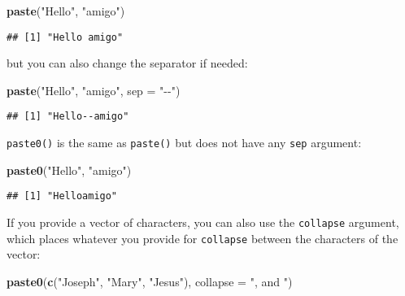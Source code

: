 \documentclass[
]{article}
\newenvironment{Shaded}{\begin{snugshade}}{\end{snugshade}}
\newcommand{\DataTypeTok}[1]{\textcolor[rgb]{0.13,0.29,0.53}{#1}}
\newcommand{\KeywordTok}[1]{\textcolor[rgb]{0.13,0.29,0.53}{\textbf{#1}}}
\newcommand{\NormalTok}[1]{#1}
\newcommand{\StringTok}[1]{\textcolor[rgb]{0.31,0.60,0.02}{#1}}
\begin{document}
\begin{Shaded}
\begin{Highlighting}[]
\KeywordTok{paste}\NormalTok{(}\StringTok{"Hello"}\NormalTok{, }\StringTok{"amigo"}\NormalTok{)}
\end{Highlighting}
\end{Shaded}

\begin{verbatim}
## [1] "Hello amigo"
\end{verbatim}

but you can also change the separator if needed:

\begin{Shaded}
\begin{Highlighting}[]
\KeywordTok{paste}\NormalTok{(}\StringTok{"Hello"}\NormalTok{, }\StringTok{"amigo"}\NormalTok{, }\DataTypeTok{sep =} \StringTok{"{-}{-}"}\NormalTok{)}
\end{Highlighting}
\end{Shaded}

\begin{verbatim}
## [1] "Hello--amigo"
\end{verbatim}

\texttt{paste0()} is the same as \texttt{paste()} but does not have any \texttt{sep} argument:

\begin{Shaded}
\begin{Highlighting}[]
\KeywordTok{paste0}\NormalTok{(}\StringTok{"Hello"}\NormalTok{, }\StringTok{"amigo"}\NormalTok{)}
\end{Highlighting}
\end{Shaded}

\begin{verbatim}
## [1] "Helloamigo"
\end{verbatim}

If you provide a vector of characters, you can also use the \texttt{collapse} argument, which places whatever you provide for \texttt{collapse} between the
characters of the vector:

\begin{Shaded}
\begin{Highlighting}[]
\KeywordTok{paste0}\NormalTok{(}\KeywordTok{c}\NormalTok{(}\StringTok{"Joseph"}\NormalTok{, }\StringTok{"Mary"}\NormalTok{, }\StringTok{"Jesus"}\NormalTok{), }\DataTypeTok{collapse =} \StringTok{", and "}\NormalTok{)}
\end{Highlighting}
\end{Shaded}
\end{document}
